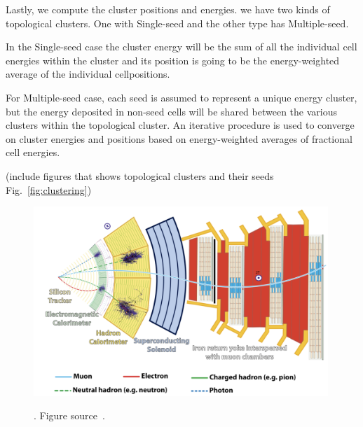 Lastly, we compute the cluster positions and energies. we have two kinds of topological clusters. One with Single-seed and the other type has Multiple-seed.

In the Single-seed case the cluster energy will be the sum of all the individual cell energies within the cluster and its position is going to be the energy-weighted average of the individual cellpositions.

For Multiple-seed case, each seed is assumed to represent a unique energy cluster, but the energy deposited in non-seed cells will be shared between the various clusters within the topological cluster. An iterative procedure is used to converge on cluster energies and positions based on energy-weighted averages of fractional cell energies. 

(include figures that shows topological clusters and their seeds Fig.~\ref{fig:clustering}) 


\begin{figure}[t!]
\centering
\includegraphics[width=0.99\textwidth]{figures/particles_signture_in_detector.png}
\caption[particles_signture_in_detector]{}. Figure source~\cite{SMtable}.                                                                        
\label{fig:Particles_in_CMS}                                                                                                               
\end{figure}


